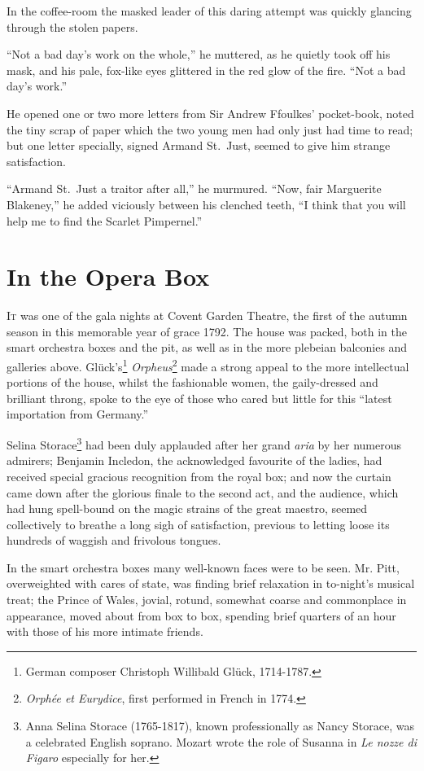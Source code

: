 \documentclass[paper=a5,BCOR=7mm,twoside,DIV=calc,12pt,usegeometry,chapterprefix,endperiod,headings=big]{scrbook}
\begin{document}
In the coffee-room the masked leader of this daring attempt was quickly glancing through the stolen papers.

\enquote{Not a bad day's work on the whole,} he muttered, as he quietly took off his mask, and his pale, fox-like eyes glittered in the red glow of the fire. \enquote{Not a bad day's work.}

He opened one or two more letters from Sir Andrew Ffoulkes’ pocket-book, noted the tiny scrap of paper which the two young men had only just had time to read; but one letter specially, signed Armand St.~Just, seemed to give him strange satisfaction.

\enquote{Armand St.~Just a traitor after all,} he murmured. \enquote{Now, fair Marguerite Blakeney,} he added viciously between his clenched teeth, \enquote{I think that you will help me to find the Scarlet Pimpernel.}

\chapter{In the Opera Box}
\lettrine[lines=4]{I}{t} was one of the gala nights at Covent Garden Theatre, the first of the autumn season in this memorable year of grace 1792. The house was packed, both in the smart orchestra boxes and the pit, as well as in the more plebeian balconies and galleries above. Glück's\footnote{German composer Christoph Willibald Glück, 1714-1787.} \textit{Orpheus}\footnote{\textit{Orphée et Eurydice}, first performed in French in 1774.} made a strong appeal to the more intellectual portions of the house, whilst the fashionable women, the gaily-dressed and brilliant throng, spoke to the eye of those who cared but little for this \enquote{latest importation from Germany.}

Selina Storace\footnote{Anna Selina Storace (1765-1817), known professionally as Nancy Storace, was a celebrated English soprano. Mozart wrote the role of Susanna in \textit{Le nozze di Figaro} especially for her.} had been duly applauded after her grand \textit{aria} by her numerous admirers; Benjamin Incledon, the acknowledged favourite of the ladies, had received special gracious recognition from the royal box; and now the curtain came down after the glorious finale to the second act, and the audience, which had hung spell-bound on the magic strains of the great maestro, seemed collectively to breathe a long sigh of satisfaction, previous to letting loose its hundreds of waggish and frivolous tongues.

In the smart orchestra boxes many well-known faces were to be seen. Mr. Pitt, overweighted with cares of state, was finding brief relaxation in to-night's musical treat; the Prince of Wales, jovial, rotund, somewhat coarse and commonplace in appearance, moved about from box to box, spending brief quarters of an hour with those of his more intimate friends.
\end{document}
